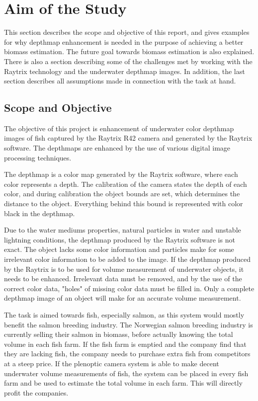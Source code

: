 \section{Aim of the Study}\label{aim of study}

This section describes the scope and objective of this report, and gives examples for why depthmap enhancement is needed in the purpose of achieving a better biomass estimation. The future goal towards biomass estimation is also explained. There is also a section describing some of the challenges met by working with the Raytrix technology and the underwater depthmap images. In addition, the last section describes all assumptions made in connection with the task at hand.


\subsection{Scope and Objective}

The objective of this project is enhancement of underwater color depthmap images of fish captured by the Raytrix R42 camera and generated by the Raytrix software. The depthmaps are enhanced by the use of various digital image processing techniques.
\newline

The depthmap is a color map generated by the Raytrix software, where each color represents a depth. The calibration of the camera states the depth of each color, and during calibration the object bounds are set, which determines the distance to the object. Everything behind this bound is represented with color black in the depthmap.

Due to the water mediums properties, natural particles in water and unstable lightning conditions, the depthmap produced by the Raytrix software is not exact. The object lacks some color information and particles make for some irrelevant color information to be added to the image.
If the depthmap produced by the Raytrix is to be used for volume measurement of underwater objects, it needs to be enhanced. Irrelevant data must be removed, and by the use of the correct color data, "holes" of missing color data must be filled in.
Only a complete depthmap image of an object will make for an accurate volume measurement.

The task is aimed towards fish, especially salmon, as this system would mostly benefit the salmon breeding industry. The Norwegian salmon breeding industry is currently selling their salmon in biomass, before actually knowing the total volume in each fish farm. If the fish farm is emptied and the company find that they are lacking fish, the company needs to purchase extra fish from competitors at a steep price. 
If the plenoptic camera system is able to make decent underwater volume measurements of fish, the system can be placed in every fish farm and be used to estimate the total volume in each farm. This will directly profit the companies.

